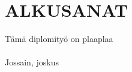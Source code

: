 \chapter*{ALKUSANAT}
Tämä diplomityö  on plaaplaa
\\
\\
\noindent Jossain, joskus
\\
\\
\noindent \textsf{\NIMI}
